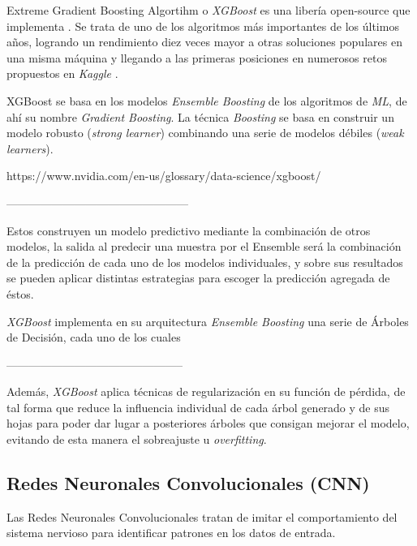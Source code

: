            
            Extreme Gradient Boosting Algortihm o \textit{XGBoost} es una libería open-source que implementa . Se trata de uno de los algoritmos más importantes de los últimos años, logrando un rendimiento diez veces mayor a otras soluciones populares en una misma máquina y llegando a las primeras posiciones en numerosos retos propuestos en \textit{Kaggle} \citep{XGBoostTutorial}.

            XGBoost se basa en los modelos \textit{Ensemble Boosting} de los algoritmos de \textit{ML}, de ahí su nombre \textit{Gradient Boosting}. La técnica \textit{Boosting} se basa en construir un modelo robusto (\textit{strong learner}) combinando una serie de modelos débiles (\textit{weak learners}).




            https://www.nvidia.com/en-us/glossary/data-science/xgboost/


            
            ------------------------------------------------

            Estos construyen un modelo predictivo mediante la combinación de otros modelos, la salida al predecir una muestra por el Ensemble será la combinación de la predicción de cada uno de los modelos individuales, y sobre sus resultados se pueden aplicar distintas estrategias para escoger la predicción agregada de éstos.

            \textit{XGBoost} implementa en su arquitectura \textit{Ensemble Boosting} una serie de Árboles de Decisión, cada uno de los cuales 

            -----------------------------------------------

            Además, \textit{XGBoost} aplica técnicas de regularización en su función de pérdida, de tal forma que reduce la influencia individual de cada árbol generado y de sus hojas para poder dar lugar a posteriores árboles que consigan mejorar el modelo, evitando de esta manera el sobreajuste u \textit{overfitting}.



        \subsection {Redes Neuronales Convolucionales (CNN)}

            Las Redes Neuronales Convolucionales tratan de imitar el comportamiento del sistema nervioso para identificar patrones en los datos de entrada.

